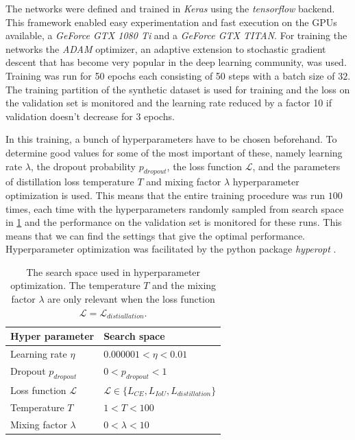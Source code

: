 \documentclass{kththesis}
\begin{document}
The networks were defined and trained in \textit{Keras} \parencite{keras} using the
\textit{tensorflow} \parencite{tensorflow} backend. This framework enabled easy
experimentation and fast execution on the GPUs available, a \textit{GeForce GTX
  1080 Ti} and a \textit{GeForce GTX TITAN}. For training the networks the
\textit{ADAM} optimizer\parencite{ADAM}, an adaptive extension to stochastic
gradient descent that has become very popular in the deep learning community, was
used. Training was run for 50 epochs each consisting of 50 steps with a batch
size of \(32\). The training partition of the synthetic dataset is used for
training and the loss on the validation set is monitored and the learning rate
reduced by a factor 10 if validation doesn't decrease for \(3\) epochs.

In this training, a bunch of hyperparameters have to be chosen beforehand. To
determine good values for some of the most important of these, namely
learning rate \(\lambda\), the dropout probability \(p_{dropout}\), the
loss function \(\mathcal{L}\), and the parameters of distillation loss
temperature \(T\) and mixing factor \(\lambda\) hyperparameter optimization is
used. This means that the entire training procedure was run \(100\) times, each
time with the hyperparameters randomly sampled from search space in
\cref{tab:search_space} and the performance on the validation set is monitored
for these runs. This means that we can find the settings that give the optimal
performance. Hyperparameter optimization was facilitated by the python package
\textit{hyperopt} \parencite{hyperopt}.

\begin{table}[]
\centering
\caption{The search space used in hyperparameter optimization. The temperature
  \(T\) and the mixing factor \(\lambda\) are only relevant when the loss
  function \(\mathcal{L} = \mathcal{L}_{distiallation}\).}
\label{tab:search_space}
\begin{tabular}{@{}ll@{}}
\toprule
Hyper parameter     & Search space \\ \midrule
Learning rate \(\eta\)      &      \(0.000001 < \eta < 0.01\)        \\
Dropout \(p_{dropout}\)&  \( 0 < p_{dropout} < 1\)            \\
Loss function \(\mathcal{L}\)    &    \(\mathcal{L} \in \{L_{CE},L_{IoU}, L_{distillation}\}\)          \\
Temperature \(T\)        &      \( 1 < T < 100\)        \\
Mixing factor \(\lambda\)      &     \(0< \lambda <10\)         \\ \bottomrule
\end{tabular}
\end{table}
\end{document}
